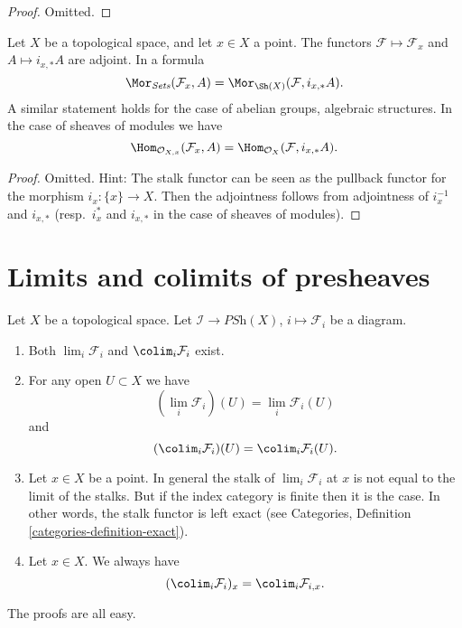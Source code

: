 \begin{proof}
Omitted.
\end{proof}

\begin{lemma}
\label{lemma-stalk-skyscraper-adjoint}
Let $X$ be a topological space, and let $x \in X$ a point.
The functors $\mathcal{F} \mapsto \mathcal{F}_x$ and
$A \mapsto i_{x, *}A$ are adjoint. In a formula
$$
\Mor_{\textit{Sets}}(\mathcal{F}_x, A)
=
\Mor_{\Sh(X)}(\mathcal{F}, i_{x, *}A).
$$
A similar statement holds for the case of
abelian groups, algebraic structures. In the case of
sheaves of modules we have
$$
\Hom_{\mathcal{O}_{X, x}}(\mathcal{F}_x, A)
=
\Hom_{\mathcal{O}_X}(\mathcal{F}, i_{x, *}A).
$$
\end{lemma}

\begin{proof}
Omitted. Hint: The stalk functor can be
seen as the pullback functor for the morphism $i_x : \{x\} \to X$.
Then the adjointness follows from adjointness of
$i_x^{-1}$ and $i_{x, *}$ (resp.\ $i_x^*$ and $i_{x, *}$
in the case of sheaves of modules).
\end{proof}









\section{Limits and colimits of presheaves}
\label{section-limits-presheaves}

\noindent
Let $X$ be a topological space.
Let $\mathcal{I} \to \textit{PSh}(X)$, $i \mapsto \mathcal{F}_i$
be a diagram.
\begin{enumerate}
\item Both $\lim_i \mathcal{F}_i$ and $\colim_i \mathcal{F}_i$
exist.
\item For any open $U \subset X$ we have
$$
(\lim_i \mathcal{F}_i)(U) =
\lim_i \mathcal{F}_i(U)
$$
and
$$
(\colim_i \mathcal{F}_i)(U) =
\colim_i \mathcal{F}_i(U).
$$
\item Let $x \in X$ be a point. In general the stalk of
$\lim_i \mathcal{F}_i$ at $x$ is not equal to
the limit of the stalks. But if the index category is finite
then it is the case. In other words, the stalk functor is
left exact (see Categories, Definition \ref{categories-definition-exact}).
\item Let $x \in X$. We always have
$$
(\colim_i \mathcal{F}_i)_x =
\colim_i \mathcal{F}_{i, x}.
$$
\end{enumerate}
The proofs are all easy.

